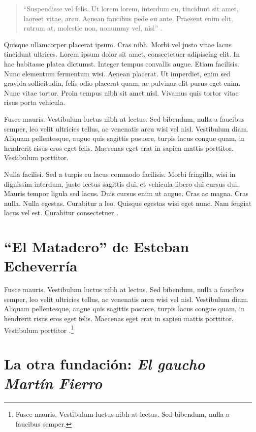 \begin{quote}
	\enquote{Suspendisse vel felis. Ut lorem lorem, interdum eu, tincidunt sit amet, laoreet vitae, arcu. Aenean faucibus pede eu ante. Praesent enim elit, rutrum at, molestie non, nonummy vel, nisl} \parencite{@3188-SHELLY2023}.
\end{quote}

Quisque ullamcorper placerat ipsum. Cras nibh. Morbi vel justo vitae lacus tincidunt ultrices. Lorem ipsum dolor sit amet, consectetuer adipiscing elit. In hac habitasse platea dictumst. Integer tempus convallis augue. Etiam facilisis. Nunc elementum fermentum wisi. Aenean placerat. Ut imperdiet, enim sed gravida sollicitudin, felis odio placerat quam, ac pulvinar elit purus eget enim. Nunc vitae tortor. Proin tempus nibh sit amet nisl. Vivamus quis tortor vitae risus porta vehicula.

Fusce mauris. Vestibulum luctus nibh at lectus. Sed bibendum, nulla a faucibus semper, leo velit ultricies tellus, ac venenatis arcu wisi vel nisl. Vestibulum diam. Aliquam pellentesque, augue quis sagittis posuere, turpis lacus congue quam, in hendrerit risus eros eget felis. Maecenas eget erat in sapien mattis porttitor. Vestibulum porttitor.

Nulla facilisi. Sed a turpis eu lacus commodo facilisis. Morbi fringilla, wisi in dignissim interdum, justo lectus sagittis dui, et vehicula libero dui cursus dui. Mauris tempor ligula sed lacus. Duis cursus enim ut augue. Cras ac magna. Cras nulla. Nulla egestas. Curabitur a leo. Quisque egestas wisi eget nunc. Nam feugiat lacus vel est. Curabitur consectetuer \parencite{@3190-QUIROGA2016}.

\section{\enquote{El Matadero} de Esteban Echeverría}

Fusce mauris. Vestibulum luctus nibh at lectus. Sed bibendum, nulla a faucibus semper, leo velit ultricies tellus, ac venenatis arcu wisi vel nisl. Vestibulum diam. Aliquam pellentesque, augue quis sagittis posuere, turpis lacus congue quam, in hendrerit risus eros eget felis. Maecenas eget erat in sapien mattis porttitor. Vestibulum porttitor \parencite{@3190-QUIROGA2016}.\footnote{Fusce mauris. Vestibulum luctus nibh at lectus. Sed bibendum, nulla a faucibus semper.}

\section{La otra fundación: \emph{El gaucho Martín Fierro}}


